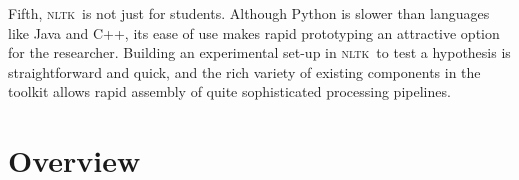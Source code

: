 \documentclass[11pt]{article}
\newcommand{\DRT}{\textsc{drt}}
\newcommand{\NLTK}{\textsc{nltk}}
\begin{document}
Fifth, \NLTK\ is not just for students. Although Python is slower than
languages like Java and C++, its ease of use makes rapid prototyping
an attractive option for the researcher. Building an experimental
set-up in \NLTK\ to test a hypothesis is straightforward and quick,
and the rich variety of existing components in the toolkit allows
rapid assembly of quite sophisticated processing pipelines.




\section{Overview}
\label{sec:overview}


\end{document}
